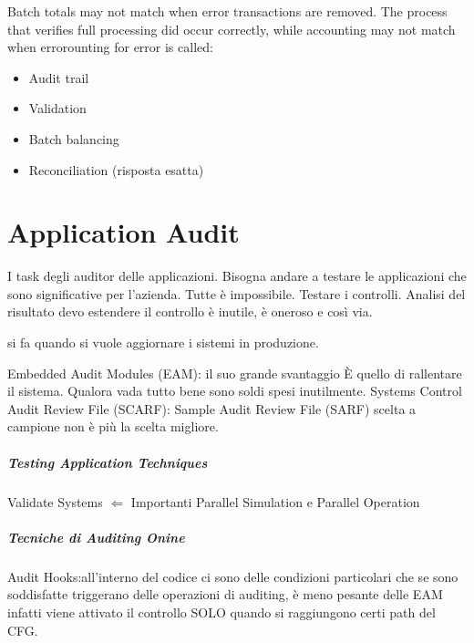 Batch totals may not match when error transactions are removed. The process that 
verifies full processing did occur correctly, while accounting may not match 
when errorounting for error is called:

\begin{itemize}
\item Audit trail
\item Validation
\item Batch balancing
\item Reconciliation (risposta esatta)
\end{itemize}



\chapter{Application Audit}

I task degli auditor delle applicazioni. Bisogna andare a testare le 
applicazioni che sono significative per l'azienda. Tutte è impossibile.
Testare i controlli. Analisi del risultato devo estendere il controllo è 
inutile, è oneroso e così via.



si fa quando si vuole aggiornare i sistemi in produzione. 

Embedded Audit Modules (EAM): il suo grande svantaggio È quello di rallentare il 
sistema. Qualora vada tutto bene sono soldi spesi inutilmente.
Systems Control Audit Review File (SCARF): 
Sample Audit Review File (SARF) scelta a campione non è più la scelta migliore.

\paragraph{Testing Application Techniques}
Validate Systems $\Leftarrow$ Importanti Parallel Simulation e Parallel 
Operation 



\paragraph{Tecniche di Auditing Onine}
Audit Hooks:all'interno del codice ci sono delle condizioni particolari che se 
sono soddisfatte triggerano delle operazioni di auditing, è meno pesante delle 
EAM infatti viene attivato il controllo SOLO quando si raggiungono certi path 
del CFG.


